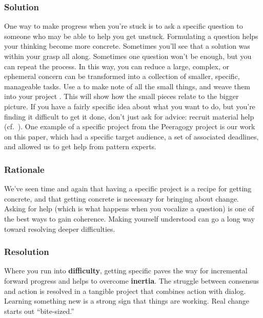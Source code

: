 \subsubsection*{Solution} 
One way to make progress when you're stuck is to ask a specific question to someone who may be able to help you get unstuck. Formulating a question helps your thinking become more concrete. Sometimes you'll see that a solution was within your grasp all along.  Sometimes one question won't be enough, but you can repeat the process. In this way, you can reduce a large, complex, or ephemeral concern can be transformed into a collection of smaller, specific, manageable tasks. Use a  to make note of all the small things, and weave them into your project . This will show how the small pieces relate to the bigger picture. If you have a fairly specific idea about what you want to do, but you're finding it difficult to get it done, don't just ask for advice: recruit material help (cf.~). One example of a specific project from the Peeragogy project is our work on this paper, which had a specific target audience, a set of associated deadlines, and allowed us to get help from pattern experts. 

\subsubsection*{Rationale} 
We've seen time and again that having a specific project is a recipe for getting concrete, and that getting concrete is necessary for bringing about change. Asking for help (which is what happens when you vocalize a question) is one of the best ways to gain coherence. Making yourself understood can go a long way toward resolving deeper difficulties.

\subsubsection*{Resolution}
Where you run into \textbf{difficulty}, getting specific paves the way for incremental forward progress and helps to overcome \textbf{inertia}. The struggle between consensus and action is resolved in a tangible project that combines action with dialog. Learning something new is a strong sign that things are working.
Real change starts out ``bite-sized.'' 

